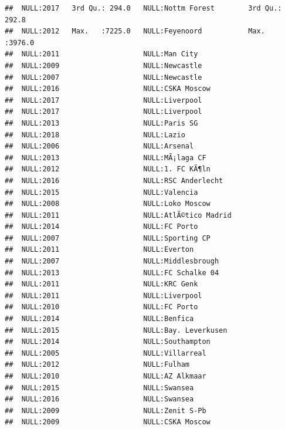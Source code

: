 \documentclass{article}\usepackage[]{graphicx}\usepackage[]{color}
\makeatletter
\newenvironment{kframe}{%
 \def\at@end@of@kframe{}%
 \ifinner\ifhmode%
  \def\at@end@of@kframe{\end{minipage}}%
  \begin{minipage}{\columnwidth}%
 \fi\fi%
 \def\FrameCommand##1{\hskip\@totalleftmargin \hskip-\fboxsep
 \colorbox{shadecolor}{##1}\hskip-\fboxsep
     \hskip-\linewidth \hskip-\@totalleftmargin \hskip\columnwidth}%
 \MakeFramed {\advance\hsize-\width
   \@totalleftmargin\z@ \linewidth\hsize
   \@setminipage}}%
 {\par\unskip\endMakeFramed%
 \at@end@of@kframe}
\newenvironment{knitrout}{}{} %
\makeatother
\begin{document}
\begin{knitrout}
\begin{kframe}
\begin{verbatim}
##  NULL:2017   3rd Qu.: 294.0   NULL:Nottm Forest        3rd Qu.: 292.8  
##  NULL:2012   Max.   :7225.0   NULL:Feyenoord           Max.   :3976.0  
##  NULL:2011                    NULL:Man City                            
##  NULL:2009                    NULL:Newcastle                           
##  NULL:2007                    NULL:Newcastle                           
##  NULL:2016                    NULL:CSKA Moscow                         
##  NULL:2017                    NULL:Liverpool                           
##  NULL:2017                    NULL:Liverpool                           
##  NULL:2013                    NULL:Paris SG                            
##  NULL:2018                    NULL:Lazio                               
##  NULL:2006                    NULL:Arsenal                             
##  NULL:2013                    NULL:MÃ¡laga CF                          
##  NULL:2012                    NULL:1. FC KÃ¶ln                         
##  NULL:2016                    NULL:RSC Anderlecht                      
##  NULL:2015                    NULL:Valencia                            
##  NULL:2008                    NULL:Loko Moscow                         
##  NULL:2011                    NULL:AtlÃ©tico Madrid                    
##  NULL:2014                    NULL:FC Porto                            
##  NULL:2007                    NULL:Sporting CP                         
##  NULL:2011                    NULL:Everton                             
##  NULL:2007                    NULL:Middlesbrough                       
##  NULL:2013                    NULL:FC Schalke 04                       
##  NULL:2011                    NULL:KRC Genk                            
##  NULL:2011                    NULL:Liverpool                           
##  NULL:2010                    NULL:FC Porto                            
##  NULL:2014                    NULL:Benfica                             
##  NULL:2015                    NULL:Bay. Leverkusen                     
##  NULL:2014                    NULL:Southampton                         
##  NULL:2005                    NULL:Villarreal                          
##  NULL:2012                    NULL:Fulham                              
##  NULL:2010                    NULL:AZ Alkmaar                          
##  NULL:2015                    NULL:Swansea                             
##  NULL:2016                    NULL:Swansea                             
##  NULL:2009                    NULL:Zenit S-Pb                          
##  NULL:2009                    NULL:CSKA Moscow                         

\end{verbatim}
\end{kframe}
\end{knitrout}
\end{document}
